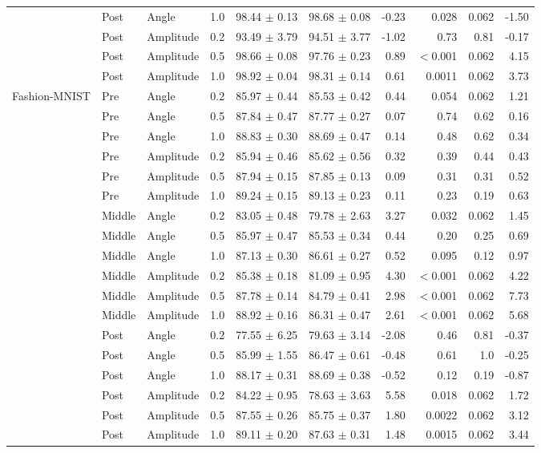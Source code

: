 \begin{table}[!t]
\begin{tabular}{llllrrrrrr}
 & Post & Angle & 1.0 & 98.44 $\pm$ 0.13 & 98.68 $\pm$ 0.08 & -0.23 & 0.028 & 0.062 & -1.50 \\
 & Post & Amplitude & 0.2 & 93.49 $\pm$ 3.79 & 94.51 $\pm$ 3.77 & -1.02 & 0.73 & 0.81 & -0.17 \\
 & Post & Amplitude & 0.5 & 98.66 $\pm$ 0.08 & 97.76 $\pm$ 0.23 & 0.89 & $<$0.001 & 0.062 & 4.15 \\
 & Post & Amplitude & 1.0 & 98.92 $\pm$ 0.04 & 98.31 $\pm$ 0.14 & 0.61 & 0.0011 & 0.062 & 3.73 \\
\midrule
Fashion-MNIST & Pre & Angle & 0.2 & 85.97 $\pm$ 0.44 & 85.53 $\pm$ 0.42 & 0.44 & 0.054 & 0.062 & 1.21 \\
 & Pre & Angle & 0.5 & 87.84 $\pm$ 0.47 & 87.77 $\pm$ 0.27 & 0.07 & 0.74 & 0.62 & 0.16 \\
 & Pre & Angle & 1.0 & 88.83 $\pm$ 0.30 & 88.69 $\pm$ 0.47 & 0.14 & 0.48 & 0.62 & 0.34 \\
 & Pre & Amplitude & 0.2 & 85.94 $\pm$ 0.46 & 85.62 $\pm$ 0.56 & 0.32 & 0.39 & 0.44 & 0.43 \\
 & Pre & Amplitude & 0.5 & 87.94 $\pm$ 0.15 & 87.85 $\pm$ 0.13 & 0.09 & 0.31 & 0.31 & 0.52 \\
 & Pre & Amplitude & 1.0 & 89.24 $\pm$ 0.15 & 89.13 $\pm$ 0.23 & 0.11 & 0.23 & 0.19 & 0.63 \\
 & Middle & Angle & 0.2 & 83.05 $\pm$ 0.48 & 79.78 $\pm$ 2.63 & 3.27 & 0.032 & 0.062 & 1.45 \\
 & Middle & Angle & 0.5 & 85.97 $\pm$ 0.47 & 85.53 $\pm$ 0.34 & 0.44 & 0.20 & 0.25 & 0.69 \\
 & Middle & Angle & 1.0 & 87.13 $\pm$ 0.30 & 86.61 $\pm$ 0.27 & 0.52 & 0.095 & 0.12 & 0.97 \\
 & Middle & Amplitude & 0.2 & 85.38 $\pm$ 0.18 & 81.09 $\pm$ 0.95 & 4.30 & $<$0.001 & 0.062 & 4.22 \\
 & Middle & Amplitude & 0.5 & 87.78 $\pm$ 0.14 & 84.79 $\pm$ 0.41 & 2.98 & $<$0.001 & 0.062 & 7.73 \\
 & Middle & Amplitude & 1.0 & 88.92 $\pm$ 0.16 & 86.31 $\pm$ 0.47 & 2.61 & $<$0.001 & 0.062 & 5.68 \\
 & Post & Angle & 0.2 & 77.55 $\pm$ 6.25 & 79.63 $\pm$ 3.14 & -2.08 & 0.46 & 0.81 & -0.37 \\
 & Post & Angle & 0.5 & 85.99 $\pm$ 1.55 & 86.47 $\pm$ 0.61 & -0.48 & 0.61 & 1.0 & -0.25 \\
 & Post & Angle & 1.0 & 88.17 $\pm$ 0.31 & 88.69 $\pm$ 0.38 & -0.52 & 0.12 & 0.19 & -0.87 \\
 & Post & Amplitude & 0.2 & 84.22 $\pm$ 0.95 & 78.63 $\pm$ 3.63 & 5.58 & 0.018 & 0.062 & 1.72 \\
 & Post & Amplitude & 0.5 & 87.55 $\pm$ 0.26 & 85.75 $\pm$ 0.37 & 1.80 & 0.0022 & 0.062 & 3.12 \\
 & Post & Amplitude & 1.0 & 89.11 $\pm$ 0.20 & 87.63 $\pm$ 0.31 & 1.48 & 0.0015 & 0.062 & 3.44 \\
\bottomrule
\end{tabular}
\end{table}
